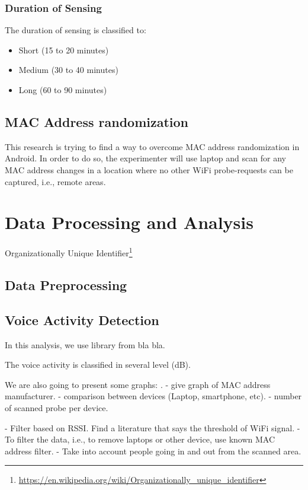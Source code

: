 \documentclass{article}
\begin{document}
\subsubsection{Duration of Sensing} %
\label{ssub:duration_of_sensing}
The duration of sensing is classified to:
\begin{itemize}
	\item Short (15 to 20 minutes)
	\item Medium (30 to 40 minutes)
	\item Long (60 to 90 minutes)
\end{itemize}

\subsection{MAC Address randomization} %
\label{sub:mac_address_randomization}
This research is trying to find a way to overcome MAC address randomization in Android. In order to do so, the experimenter will use laptop and scan for any MAC address changes in a location where no other WiFi probe-requests can be captured, i.e., remote areas.

\section{Data Processing and Analysis} %
\label{sec:data_processing_and_analysis}
Organizationally Unique Identifier\footnote{\url{https://en.wikipedia.org/wiki/Organizationally_unique_identifier}}

\subsection{Data Preprocessing} %
\label{sub:data_preprocessing}


\subsection{Voice Activity Detection} %
\label{sub:voice_activity_detection}
In this analysis, we use library from bla bla.

The voice activity is classified in several level (dB).

We are also going to present some graphs: .
	- give graph of MAC address manufacturer.
	- comparison between devices (Laptop, smartphone, etc).
	- number of scanned probe per device.

- Filter based on RSSI. Find a literature that says the threshold of WiFi signal.
- To filter the data, i.e., to remove laptops or other device, use known MAC address filter.
- Take into account people going in and out from the scanned area.


% 
\end{document}
